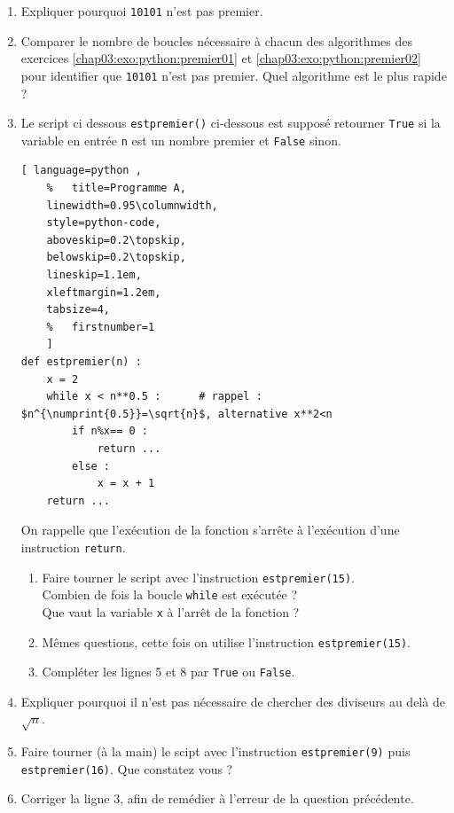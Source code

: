 \begin{exercise}\label{chap03:exo:python:premier03} \hfill 

	\begin{enumerate}[label={\arabic*)}, leftmargin=*]   
	\item Expliquer pourquoi \lstinline|10101| n'est pas premier. 
	\item Comparer le nombre de boucles nécessaire à chacun des algorithmes des exercices \ref{chap03:exo:python:premier01} et \ref{chap03:exo:python:premier02} pour identifier que  \lstinline|10101| n'est pas premier. Quel algorithme est le plus rapide ?
	\item Le script ci dessous  \lstinline|estpremier()| ci-dessous est supposé retourner \lstinline|True| si la variable en entrée \lstinline|n| est un nombre premier et \lstinline|False| sinon.
	
\noindent\begin{lstlisting}[ language=python , 
	%	title=Programme A,   
	linewidth=0.95\columnwidth,
	style=python-code,    
	aboveskip=0.2\topskip,
	belowskip=0.2\topskip,
	lineskip=1.1em,
	xleftmargin=1.2em,
	tabsize=4,
	%	firstnumber=1  
	]
def estpremier(n) :
	x = 2
	while x < n**0.5 :		# rappel : $n^{\numprint{0.5}}=\sqrt{n}$, alternative x**2<n
		if n%x== 0 :		
			return ...
		else :
			x = x + 1
	return ...
\end{lstlisting}	
	On rappelle que l'exécution de la fonction s'arrête à l'exécution d'une instruction  \lstinline|return|. 
	\begin{enumerate}[label={\alph*)}, leftmargin=*]   
		\item Faire tourner le script avec l'instruction \lstinline|estpremier(15)|.\\
			Combien de fois la boucle \lstinline|while| est exécutée ?\\
			Que vaut la variable \lstinline|x| à l'arrêt de la fonction ?
		\item Mêmes questions, cette fois on utilise l'instruction \lstinline|estpremier(15)|.
		\item Compléter les lignes 5 et 8 par \lstinline|True| ou \lstinline|False|.
	\end{enumerate} 
	\item Expliquer pourquoi il n'est pas nécessaire de chercher des diviseurs au delà de $\sqrt{n}$. 
	\item Faire tourner (à la main) le scipt avec l'instruction \lstinline|estpremier(9)| puis \lstinline|estpremier(16)|. Que constatez vous ?
	\item Corriger la ligne 3, afin de remédier à l'erreur de la question précédente.
	\end{enumerate} 
\end{exercise}
